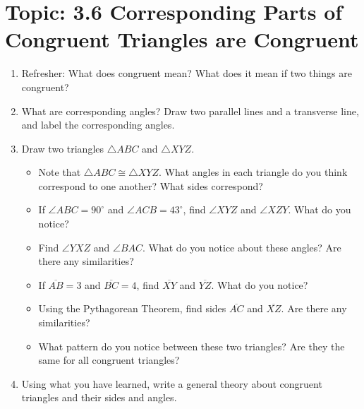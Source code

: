 \documentclass[12pt,letterpaper]{article}
\begin{document}

\newpage
\section*{Topic: 3.6 Corresponding Parts of Congruent Triangles are Congruent}
\begin{enumerate}[label=\arabic*.]
    \item Refresher: What does congruent mean? What does it mean if two things are congruent?
    \item What are corresponding angles? Draw two parallel lines and a transverse line, and label the corresponding angles.
    \item Draw two triangles $\triangle ABC$ and $\triangle XYZ$.
          \begin{itemize}
              \item Note that $\triangle ABC \cong \triangle XYZ$. What angles in each triangle do you think correspond to one another? What sides correspond?
              \item If $\angle ABC = 90^{\circ}$ and $\angle ACB = 43^{\circ}$, find $\angle XYZ$ and $\angle XZY$. What do you notice?
              \item Find $\angle YXZ$ and $\angle BAC$. What do you notice about these angles? Are there any similarities?
              \item If $\overline{AB} = 3$ and $\overline{BC} = 4$, find $\overline{XY}$ and $\overline{YZ}$. What do you notice?
              \item Using the Pythagorean Theorem, find sides $\overline{AC}$ and $\overline{XZ}$. Are there any similarities?
              \item What pattern do you notice between these two triangles? Are they the same for all congruent triangles?
          \end{itemize}
    \item Using what you have learned, write a general theory about congruent triangles and their sides and angles.
\end{enumerate}
\end{document}
